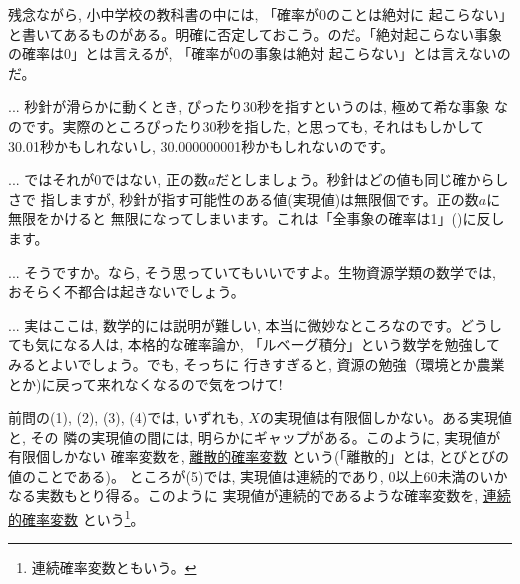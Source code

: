 残念ながら, 小中学校の教科書の中には, 「確率が0のことは絶対に
起こらない」と書いてあるものがある。明確に否定しておこう。のだ。「絶対起こらない事象の確率は0」とは言えるが, 「確率が0の事象は絶対
起こらない」とは言えないのだ。

\begin{faq}{\small{}
... 秒針が滑らかに動くとき, ぴったり30秒を指すというのは, 極めて希な事象
なのです。実際のところぴったり30秒を指した, と思っても, それはもしかして
30.01秒かもしれないし, 30.000000001秒かもしれないのです。}\end{faq}

\begin{faq}{\small{}
... ではそれが0ではない, 正の数$a$だとしましょう。秒針はどの値も同じ確からしさで
指しますが, 秒針が指す可能性のある値(実現値)は無限個です。正の数$a$に無限をかけると
無限になってしまいます。これは「全事象の確率は1」()に反します。}\end{faq}

\begin{faq}{\small{}
... そうですか。なら, そう思っていてもいいですよ。生物資源学類の数学では, 
おそらく不都合は起きないでしょう。}\end{faq}

\begin{faq}{\small{}
... 実はここは, 数学的には説明が難しい, 本当に微妙なところなのです。どうしても気になる人は, 
本格的な確率論か, 「ルベーグ積分」という数学を勉強してみるとよいでしょう。でも, そっちに
行きすぎると, 資源の勉強（環境とか農業とか)に戻って来れなくなるので気をつけて!}\end{faq}

前問の(1), (2), (3), (4)では, いずれも, $X$の実現値は有限個しかない。ある実現値と, その
隣の実現値の間には, 明らかにギャップがある。このように, 実現値が有限個しかない
確率変数を, \underline{離散的確率変数}
という(「離散的」とは, とびとびの値のことである)。
ところが(5)では, 実現値は連続的であり, 0以上60未満のいかなる実数もとり得る。このように
実現値が連続的であるような確率変数を, \underline{連続的確率変数}
という\footnote{連続確率変数ともいう。}。\\



